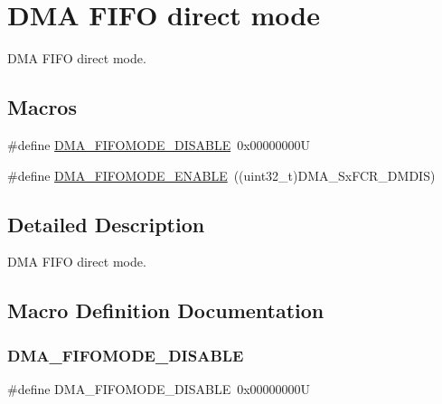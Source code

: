\hypertarget{group___d_m_a___f_i_f_o__direct__mode}{}\section{D\+MA F\+I\+FO direct mode}
\label{group___d_m_a___f_i_f_o__direct__mode}


D\+MA F\+I\+FO direct mode.  


\subsection*{Macros}
\begin{DoxyCompactItemize}
\item 
\#define \hyperlink{group___d_m_a___f_i_f_o__direct__mode_gaec22b199f9da9214bf908d7edbcd83e8}{D\+M\+A\+\_\+\+F\+I\+F\+O\+M\+O\+D\+E\+\_\+\+D\+I\+S\+A\+B\+LE}~0x00000000U
\item 
\#define \hyperlink{group___d_m_a___f_i_f_o__direct__mode_ga18709570bed6b9112520701c482fbe4b}{D\+M\+A\+\_\+\+F\+I\+F\+O\+M\+O\+D\+E\+\_\+\+E\+N\+A\+B\+LE}~((uint32\+\_\+t)D\+M\+A\+\_\+\+Sx\+F\+C\+R\+\_\+\+D\+M\+D\+IS)
\end{DoxyCompactItemize}


\subsection{Detailed Description}
D\+MA F\+I\+FO direct mode. 



\subsection{Macro Definition Documentation}
\mbox{\label{group___d_m_a___f_i_f_o__direct__mode_gaec22b199f9da9214bf908d7edbcd83e8}} 
\subsubsection{\texorpdfstring{D\+M\+A\+\_\+\+F\+I\+F\+O\+M\+O\+D\+E\+\_\+\+D\+I\+S\+A\+B\+LE}{DMA\_FIFOMODE\_DISABLE}}
{\footnotesize\ttfamily \#define D\+M\+A\+\_\+\+F\+I\+F\+O\+M\+O\+D\+E\+\_\+\+D\+I\+S\+A\+B\+LE~0x00000000U}

